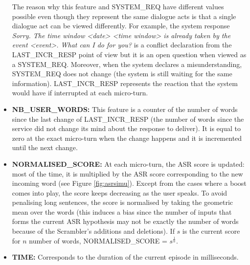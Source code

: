\begin{itemize}
							The reason why this feature and SYSTEM\_REQ have different values possible even though they represent the same dialogue acts is that a single dialogue act can be viewed differently. For example, the system response \textit{Sorry. The time window <date> <time window> is already taken by the event <event>. What can I do for you?} is a conflict declaration from the LAST\_INCR\_RESP point of view but it is an open question when viewed as a SYSTEM\_REQ. Moreover, when the system declares a misunderstanding, SYSTEM\_REQ does not change (the system is still waiting for the same information). LAST\_INCR\_RESP represents the reaction that the system would have if interrupted at each micro-turn.
						
            \item \textbf{NB\_USER\_WORDS:} This feature is a counter of the number of words since the last change of LAST\_INCR\_RESP (the number of words since the service did not change its mind about the response to deliver). It is equal to zero at the exact micro-turn when the change happens and it is incremented until the next change.
						
            \item \textbf{NORMALISED\_SCORE:} At each micro-turn, the ASR score is updated: most of the time, it is multiplied by the ASR score corresponding to the new incoming word (see Figure \ref{fig:asrsimu}). Except from the cases where a boost comes into play, the score keeps decreasing as the user speaks. To avoid penalising long sentences, the score is normalised by taking the geometric mean over the words (this induces a bias since the number of inputs that forms the current ASR hypothesis may not be exactly the number of words because of the Scrambler's additions and deletions). If $s$ is the current score for $n$ number of words, NORMALISED\_SCORE = $s^{\frac{1}{n}}$.
            \item \textbf{TIME:} Corresponds to the duration of the current episode in milliseconds.
        \end{itemize}
				
